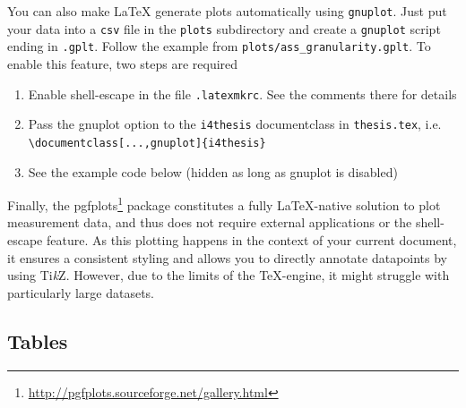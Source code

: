 You can also make \LaTeX{} generate plots automatically using \texttt{gnuplot}.
Just put your data into a \texttt{csv} file in the \texttt{plots} subdirectory and create a \texttt{gnuplot} script ending in \texttt{.gplt}.
Follow the example from \texttt{plots/ass\_granularity.gplt}.
To enable this feature, two steps are required

\begin{enumerate}
	\item Enable shell-escape in the file \verb!.latexmkrc!. See the comments there for details
	\item Pass the gnuplot option to the \verb!i4thesis! documentclass in \verb!thesis.tex!, i.e.\\\verb!\documentclass[...,gnuplot]{i4thesis}!
	\item See the example code below (hidden as long as gnuplot is disabled)
\end{enumerate}


Finally, the pgfplots\footnote{\url{http://pgfplots.sourceforge.net/gallery.html}} package constitutes a fully \LaTeX{}-native solution to plot measurement data, and thus does not require external applications or the shell-escape feature. As this plotting happens in the context of your current document, it ensures a consistent styling and allows you to directly annotate datapoints by using Ti\textit{k}Z. However, due to the limits of the \TeX{}-engine, it might struggle with particularly large datasets.

\subsection{Tables}

